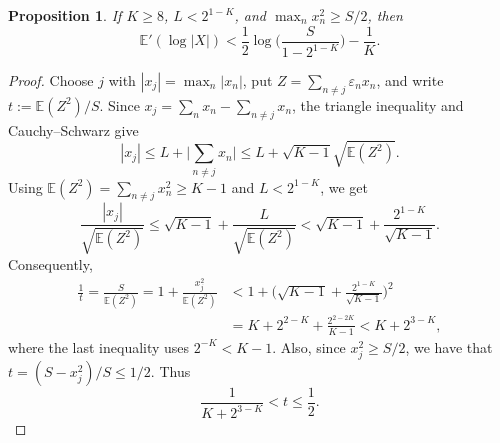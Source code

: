 \documentclass[reqno,12pt]{amsart}
\newtheorem{proposition}[theorem]{Proposition}
\theoremstyle{remark}
\newcommand{\EE}{\mathbb{E}}
\begin{document}
\begin{proposition}\label{prop large coordinate}
If $K\geq 8$, $L<2^{1-K}$, and $\max_nx_n^2\geq S/2$, then
$$ \EE'(\log|X|) < \frac{1}{2}\log\bigg(\frac{S}{1-2^{1-K}}\bigg)-\frac{1}{K}. $$
\end{proposition}
\begin{proof}
Choose $j$ with $|x_j|=\max_n|x_n|$, put $Z = \sum_{n\neq j}\varepsilon_n x_n$, and write $t := \EE(Z^2)/S$. Since $x_j=\sum_nx_n-\sum_{n\neq j}x_n$, the triangle inequality and Cauchy--Schwarz give
$$ |x_j|\leq L+\bigg|\sum_{n\neq j}x_n\bigg|
\leq L+\sqrt{K-1}\sqrt{\EE(Z^2)}. $$
Using $\EE(Z^2)=\sum_{n\neq j}x_n^2\geq K-1$ and $L<2^{1-K}$, we get
$$ \frac{|x_j|}{\sqrt{\EE(Z^2)}}
\leq\sqrt{K-1}+\frac{L}{\sqrt{\EE(Z^2)}}
<\sqrt{K-1}+\frac{2^{1-K}}{\sqrt{K-1}}. $$
Consequently,
\begin{align*}
\frac1t=\frac{S}{\EE(Z^2)}=1+\frac{x_j^2}{\EE(Z^2)}
&<1+\bigg(\sqrt{K-1}+\frac{2^{1-K}}{\sqrt{K-1}}\bigg)^2\\
&=K+2^{2-K}+\frac{2^{2-2K}}{K-1}<K+2^{3-K},
\end{align*}
where the last inequality uses $2^{-K}<K-1$. Also, since $x_j^2\geq S/2$, we have that $t=(S-x_j^2)/S\leq 1/2$. Thus
\begin{equation}\label{equation variance fraction}
\frac1{K+2^{3-K}}<t\leq\frac{1}{2}.
\end{equation}


\end{proof}
\end{document}
